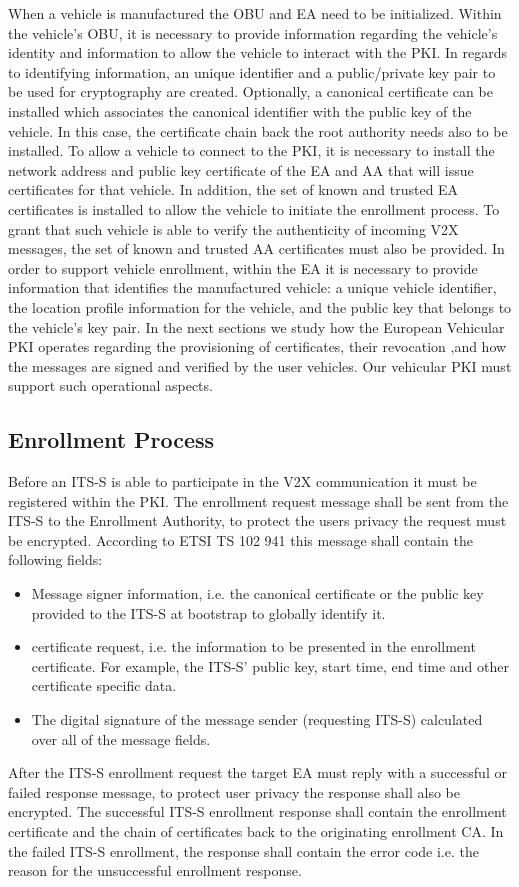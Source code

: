 When a vehicle is manufactured the OBU and EA need to be initialized. Within the vehicle's OBU, it is necessary to provide information regarding the vehicle's identity and information to allow the vehicle to interact with the PKI. In regards to identifying information, an unique identifier and a public\slash private key pair to be used for cryptography are created. Optionally, a canonical certificate can be installed which associates the canonical identifier with the public key of the vehicle. In this case, the certificate chain back the root authority needs also to be installed. To allow a vehicle to connect to the PKI, it is necessary to install the network address and public key certificate of the EA and AA that will issue certificates for that vehicle. In addition, the set of known and trusted EA certificates is installed to allow the vehicle to initiate the enrollment process. To grant that such vehicle is able to verify the authenticity of incoming V2X messages, the set of known and trusted AA certificates must also be provided. In order to support vehicle enrollment, within the EA it is necessary to provide information that identifies the manufactured vehicle: a unique vehicle identifier, the location profile information for the vehicle, and the public key that belongs to the vehicle's key pair. In the next sections we study how the European Vehicular PKI operates regarding the provisioning of certificates, their revocation ,and how the messages are signed and verified by the user vehicles. Our vehicular PKI must support such operational aspects.

\subsection{Enrollment Process}

Before an ITS-S is able to participate in the V2X communication it must be registered within the PKI. The enrollment request message shall be sent from the ITS-S to the Enrollment Authority, to protect the users privacy the request must be encrypted. According to ETSI TS 102 941 \cite{etsi_privacy} this message shall contain the following fields:
\begin{itemize}
	\item{ Message signer information, i.e. the canonical certificate or the public key provided to the ITS-S at bootstrap to globally identify it.}
	\item{ certificate request, i.e. the information to be presented in the enrollment certificate. For example, the ITS-S' public key, start time, end time and other certificate specific data.}
	\item{ The digital signature of the message sender (requesting ITS-S) calculated over all of the message fields.}
\end{itemize}
After the ITS-S enrollment request the target EA must reply with a successful or failed response message, to protect user privacy the response shall also be encrypted. The successful ITS-S enrollment response shall contain the enrollment certificate and the chain of certificates back to the originating enrollment CA. In the failed ITS-S enrollment, the response shall contain the error code i.e. the reason for the unsuccessful enrollment response. 


